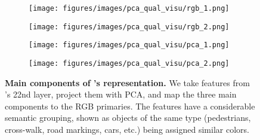 





\begin{figure}[h]
\centering
\begin{subfigure}{0.48\linewidth} 
\texttt{[image: figures/images/pca\_qual\_visu/rgb\_1.png]}
\hfill
\end{subfigure}
\centering
\begin{subfigure}{0.48\linewidth} 
\texttt{[image: figures/images/pca\_qual\_visu/rgb\_2.png]}
\hfill
\end{subfigure}
\centering
\begin{subfigure}{0.48\linewidth} 
\texttt{[image: figures/images/pca\_qual\_visu/pca\_1.png]}
\hfill
\end{subfigure}
\centering
\begin{subfigure}{0.48\linewidth} 
\texttt{[image: figures/images/pca\_qual\_visu/pca\_2.png]}
\hfill
\end{subfigure}
\centering
\caption{\textbf{Main components of \vm's representation.} We take features from \vm{}'s 22nd layer, project them with PCA, and map the three main components to the RGB primaries. The features have a considerable semantic grouping, shown as objects of the same type (pedestrians, cross-walk, road markings, cars, etc.) being assigned similar colors.}
\label{fig:pca_qual_results}
\end{figure}